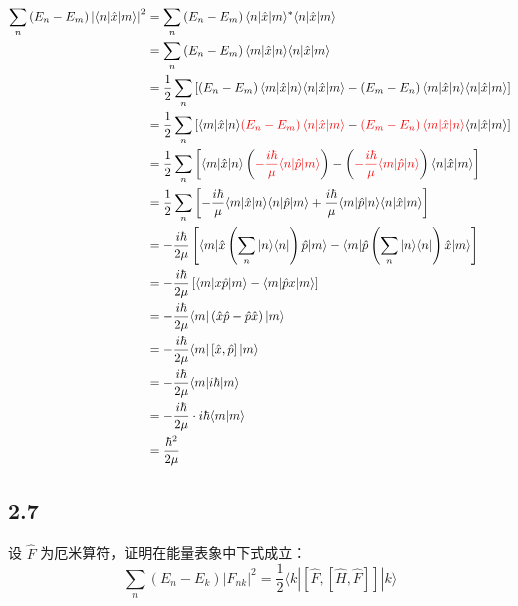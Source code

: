 \begin{equation}
    \begin{aligned}
        \sum_n{\left( E_n-E_m \right) \left| \langle n|\hat{x}|m\rangle \right|^2}&=\sum_n{\left( E_n-E_m \right) \langle n|\hat{x}|m\rangle ^*\langle n|\hat{x}|m\rangle}
\\
&=\sum_n{\left( E_n-E_m \right) \langle m|\hat{x}|n\rangle \langle n|\hat{x}|m\rangle}
\\
&=\frac{1}{2}\sum_n{\left[ \left( E_n-E_m \right) \langle m|\hat{x}|n\rangle \langle n|\hat{x}|m\rangle -\left( E_m-E_n \right) \langle m|\hat{x}|n\rangle \langle n|\hat{x}|m\rangle \right]}
\\
&=\frac{1}{2}\sum_n{\left[ \langle m|\hat{x}|n\rangle {\color[RGB]{240, 0, 0} \left( E_n-E_m \right) \langle n|\hat{x}|m\rangle }-{\color[RGB]{240, 0, 0} \left( E_m-E_n \right) \langle m|\hat{x}|n\rangle }\langle n|\hat{x}|m\rangle \right]}
\\
&=\frac{1}{2}\sum_n{\left[ \langle m|\hat{x}|n\rangle \left( {\color[RGB]{240, 0, 0} -\frac{i\hbar}{\mu}\langle n|\hat{p}|m\rangle } \right) -\left( {\color[RGB]{240, 0, 0} -\frac{i\hbar}{\mu}\langle m|\hat{p}|n\rangle } \right) \langle n|\hat{x}|m\rangle \right]}
\\
&=\frac{1}{2}\sum_n{\left[ -\frac{i\hbar}{\mu}\langle m|\hat{x}|n\rangle \langle n|\hat{p}|m\rangle +\frac{i\hbar}{\mu}\langle m|\hat{p}|n\rangle \langle n|\hat{x}|m\rangle \right]}
\\
&=-\frac{i\hbar}{2\mu}\left[ \langle m|\hat{x}\left( \sum_n{|n\rangle \langle n|} \right) \hat{p}|m\rangle -\langle m|\hat{p}\left( \sum_n{|n\rangle \langle n|} \right) \hat{x}|m\rangle \right] 
\\
&=-\frac{i\hbar}{2\mu}\left[ \langle m|x\hat{p}|m\rangle -\langle m|\hat{p}x|m\rangle \right] 
\\
&=-\frac{i\hbar}{2\mu}\langle m|\left( \hat{x}\hat{p}-\hat{p}\hat{x} \right) |m\rangle 
\\
&=-\frac{i\hbar}{2\mu}\langle m|\left[ \hat{x},\hat{p} \right] |m\rangle 
\\
&=-\frac{i\hbar}{2\mu}\langle m|i\hbar |m\rangle 
\\
&=-\frac{i\hbar}{2\mu}\cdot i\hbar \langle m|m\rangle 
\\
&=\frac{\hbar ^2}{2\mu}
    \end{aligned}
\end{equation}



\newpage
\subsection{2.7}
设 $\hat{F}$ 为厄米算符，证明在能量表象中下式成立：
$$\sum_{n} (E_n - E_k) |F_{nk}|^2 = \frac{1}{2} \langle k| [\hat{F}, [\hat{H}, \hat{F}]] |k \rangle$$

